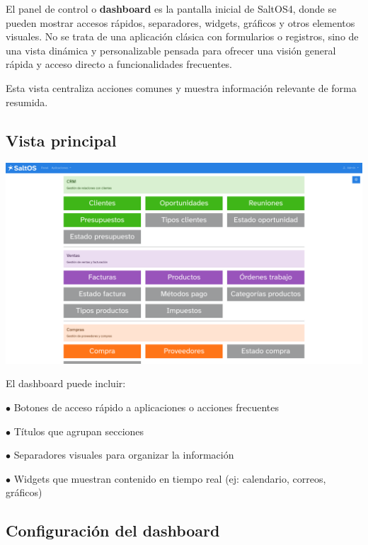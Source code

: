 \documentclass[a4paper]{article}
\begin{document}
El panel de control o \textbf{dashboard} es la pantalla inicial de SaltOS4, donde se pueden mostrar accesos rápidos, separadores, widgets, gráficos y otros elementos visuales.
No se trata de una aplicación clásica con formularios o registros, sino de una vista dinámica y personalizable pensada para ofrecer una visión general rápida y acceso directo a funcionalidades frecuentes.

Esta vista centraliza acciones comunes y muestra información relevante de forma resumida.

\hypertarget{toc83}{}
\subsection{Vista principal}

\begin{center}\includegraphics[width=1\textwidth]{../ujest/snaps/test-screenshots-js-screenshots-dashboard-dashboard-es-es-1-snap.png}\end{center}

El dashboard puede incluir:

\begin{compactitem}
\item[\color{myblue}$\bullet$] Botones de acceso rápido a aplicaciones o acciones frecuentes
\item[\color{myblue}$\bullet$] Títulos que agrupan secciones
\item[\color{myblue}$\bullet$] Separadores visuales para organizar la información
\item[\color{myblue}$\bullet$] Widgets que muestran contenido en tiempo real (ej: calendario, correos, gráficos)
\end{compactitem}

\hypertarget{toc84}{}
\subsection{Configuración del dashboard}
\end{document}
